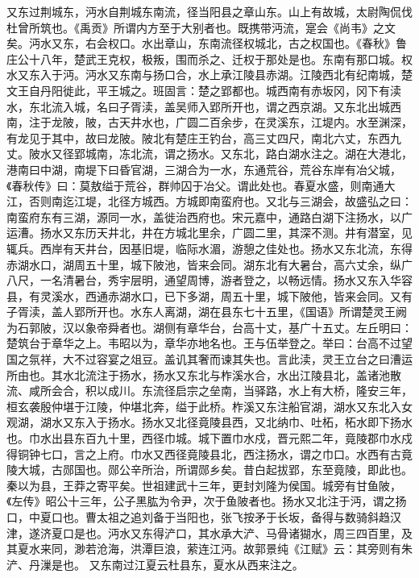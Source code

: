 \documentclass[12pt,UTF8]{ctexbook}
\begin{document}
又东过荆城东，沔水自荆城东南流，径当阳县之章山东。山上有故城，太尉陶侃伐杜曾所筑也。《禹贡》所谓内方至于大别者也。既携带沔流，寔会《尚韦》之文矣。沔水又东，右会权口。水出章山，东南流径权城北，古之权国也。《春秋》鲁庄公十八年，楚武王克权，极叛，围而杀之、迁权于那处是也。东南有那口城。权水又东入于沔。沔水又东南与扬口合，水上承江陵县赤湖。江陵西北有纪南城，楚文王自丹阳徙此，平王城之。班固言：楚之郢都也。城西南有赤坂冈，冈下有渎水，东北流入城，名曰子胥渎，盖吴师入郢所开也，谓之西京湖。又东北出城西南，注于龙陂，陂，古天井水也，广圆二百余步，在灵溪东，江堤内。水至渊深，有龙见于其中，故曰龙陂。陂北有楚庄王钓台，高三丈四尺，南北六丈，东西九丈。陂水又径郢城南，冻北流，谓之扬水。又东北，路白湖水注之。湖在大港北，港南曰中湖，南堤下曰昏官湖，三湖合为一水，东通荒谷，荒谷东岸有冶父城，《春秋传》曰：莫敖缢于荒谷，群帅囚于冶父。谓此处也。春夏水盛，则南通大江，否则南迄江堤，北径方城西。方城即南蛮府也。又北与三湖会，故盛弘之曰：南蛮府东有三湖，源同一水，盖徙治西府也。宋元嘉中，通路白湖下注扬水，以广运漕。扬水又东历天井北，井在方城北里余，广圆二里，其深不测。井有潜室，见辄兵。西岸有天井台，因基旧堤，临际水湄，游憩之佳处也。扬水又东北流，东得赤湖水口，湖周五十里，城下陂池，皆来会同。湖东北有大暑台，高六丈余，纵广八尺，一名清暑台，秀宇层明，通望周博，游者登之，以畅远情。扬水又东入华容县，有灵溪水，西通赤湖水口，已下多湖，周五十里，城下陂他，皆来会同。又有子胥渎，盖人郢所开也。水东人离湖，湖在县东七十五里，《国语》所谓楚灵王阙为石郭陂，汉以象帝舜者也。湖侧有章华台，台高十丈，基广十五丈。左丘明曰：楚筑台于章华之上。韦昭以为，章华亦地名也。王与伍举登之。举曰：台高不过望国之氛祥，大不过容宴之俎豆。盖讥其奢而谏其失也。言此渎，灵王立台之曰漕运所由也。其水北流注于扬水，扬水又东北与柞溪水合，水出江陵县北，盖诸池散流、咸所会合，积以成川。东流径启宗之垒南，当驿路，水上有大桥，隆安三年，桓玄袭殷仲堪于江陵，仲堪北奔，缢于此桥。柞溪又东注船官湖，湖水又东北入女观湖，湖水又东入于扬水。扬水又北径竟陵县西，又北纳巾、吐柘，柘水即下扬水也。巾水出县东百九十里，西径巾城。城下置巾水戍，晋元熙二年，竟陵郡巾水戍得铜钟七口，言之上府。巾水又西径竟陵县北，西注扬水，谓之巾口。水西有古竟陵大城，古郧国也。郧公辛所治，所谓郧乡矣。昔白起拔郢，东至竟陵，即此也。秦以为县，王莽之寄平矣。世祖建武十三年，更封刘隆为侯国。城旁有甘鱼陂，《左传》昭公十三年，公子黑肱为令尹，次于鱼陂者也。扬水又北注于沔，谓之扬口，中夏口也。曹太祖之追刘备于当阳也，张飞按矛于长坂，备得与数骑斜趋汉津，遂济夏口是也。沔水又东得浐口，其水承大浐、马骨诸猢水，周三四百里，及其夏水来同，渺若沧海，洪潭巨浪，萦连江沔。故郭景纯《江赋》云：其旁则有朱浐、丹漅是也。
又东南过江夏云杜县东，夏水从西来注之。
\end{document}
